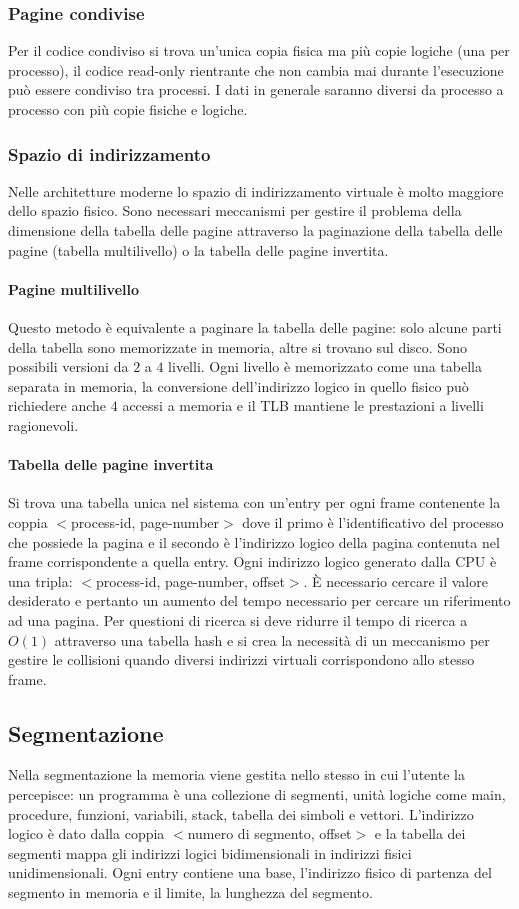 \subsubsection{Pagine condivise}
Per il codice condiviso si trova un'unica copia fisica ma pi\`u copie logiche (una per processo), il codice read-only rientrante che non cambia mai durante l'esecuzione pu\`o essere
condiviso tra processi. I dati in generale saranno diversi da processo a processo con pi\`u copie fisiche e logiche. 
\subsubsection{Spazio di indirizzamento}
Nelle architetture moderne lo spazio di indirizzamento virtuale \`e molto maggiore dello spazio fisico. Sono necessari meccanismi per gestire il problema della dimensione della
tabella delle pagine attraverso la paginazione della tabella delle pagine (tabella multilivello) o la tabella delle pagine invertita. 
\paragraph{Pagine multilivello}
Questo metodo \`e equivalente a paginare la tabella delle pagine: solo alcune parti della tabella sono memorizzate in memoria, altre si trovano sul disco. Sono possibili versioni da
$2$ a $4$ livelli. Ogni livello \`e memorizzato come una tabella separata in memoria, la conversione dell'indirizzo logico in quello fisico pu\`o richiedere anche $4$ accessi a memoria
e il TLB mantiene le prestazioni a livelli ragionevoli. 
\paragraph{Tabella delle pagine invertita}
Si trova una tabella unica nel sistema con un'entry per ogni frame contenente la coppia $<$process-id, page-number$>$ dove il primo \`e l'identificativo del processo che possiede la
pagina e il secondo \`e l'indirizzo logico della pagina contenuta nel frame corrispondente a quella entry. Ogni indirizzo logico generato dalla CPU \`e una tripla: $<$process-id, 
page-number, offset$>$. \`E necessario cercare il valore desiderato e pertanto un aumento del tempo necessario per cercare un riferimento ad una pagina. Per questioni di ricerca si
deve ridurre il tempo di ricerca a $O(1)$ attraverso una tabella hash e si crea la necessit\`a di un meccanismo per gestire le collisioni quando diversi indirizzi virtuali corrispondono
allo stesso frame. 
\subsection{Segmentazione}
Nella segmentazione la memoria viene gestita nello stesso in cui l'utente la percepisce: un programma \`e una collezione di segmenti, unit\`a logiche come main, procedure, funzioni, 
variabili, stack, tabella dei simboli e vettori. L'indirizzo logico \`e dato dalla coppia $<$numero di segmento, offset$>$ e la tabella dei segmenti mappa gli indirizzi logici 
bidimensionali in indirizzi fisici unidimensionali. Ogni entry contiene una base, l'indirizzo fisico di partenza del segmento in memoria e il limite, la lunghezza del segmento. 

